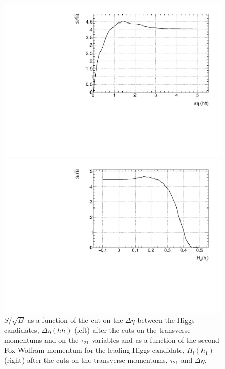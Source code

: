 \begin{figure}
	\centering
	\begin{minipage}{.5\textwidth}
		\centering
		\includegraphics[trim={.6cm 0 0 0},clip,width=\linewidth]{./Figures/SSB_hh_deltaEta.pdf}
	\end{minipage}%
	\begin{minipage}{.5\textwidth}
		\centering
		\includegraphics[trim={0 0 .6cm 0},clip,width=\linewidth]{./Figures/SSB_h1_FW2.pdf}
	\end{minipage}
	\label{fig:SSB_hh_deltaEta}
	\caption{$S/\sqrt{B}$ as a function of the cut on the $\Delta\eta$ between the Higgs candidates, $\Delta\eta(hh)$ (left) after the cuts on the transverse momentums and on the $\tau_{21}$ variables and as a function of the second Fox-Wolfram momentum for the leading Higgs candidate, $H_l(h_1)$ (right) after the cuts on the transverse momentums, $\tau_{21}$ and $\Delta\eta$.}
\end{figure} 

